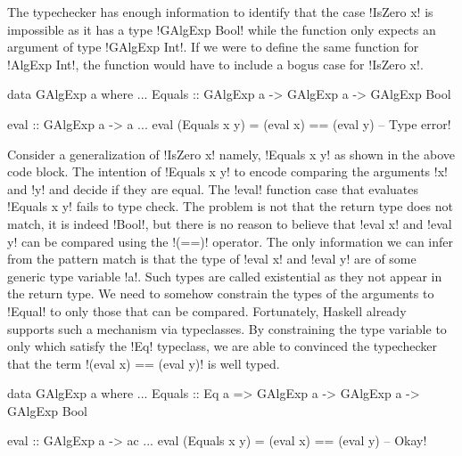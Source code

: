 \documentclass[screen,nonacm]{acmart}
\begin{document}
The typechecker has enough information to identify that the case
!IsZero x! is impossible as it has a type !GAlgExp Bool! while the
function only expects an argument of type !GAlgExp Int!. If we were to
define the same function for !AlgExp Int!, the function
would have to include a bogus case for !IsZero x!.

\begin{minipage}[ht]{0.6\linewidth}
\begin{CenteredBox}
\begin{code}
data GAlgExp a where
  ...
  Equals :: GAlgExp a -> GAlgExp a -> GAlgExp Bool
\end{code}
\end{CenteredBox}
\end{minipage}%
\begin{minipage}[ht]{0.4\linewidth}
\begin{CenteredBox}
\begin{code}
eval :: GAlgExp a -> a
...
eval (Equals x y) = (eval x) == (eval y)
                           -- Type error!
\end{code}
\end{CenteredBox}
\end{minipage}

Consider a generalization of !IsZero x! namely, !Equals x y! as shown
in the above code block. The intention of !Equals x y! to
encode comparing the arguments !x! and !y! and decide if they are
equal. The !eval! function case that evaluates !Equals x y! fails
to type check. The problem is not that the return type does not match,
it is indeed !Bool!, but there is no reason to believe that
!eval x! and !eval y! can be compared using the !(==)! operator. The
only information we can infer from the pattern match is that
the type of !eval x! and !eval y! are of some generic type variable
!a!. Such types are called existential as they not appear in
the return type. We need to somehow constrain the types of the
arguments to !Equal! to only those that can be compared.
Fortunately, Haskell already supports such a mechanism via
typeclasses. By constraining the type variable to only which satisfy
the !Eq! typeclass, we are able to convinced the typechecker that the
term !(eval x) == (eval y)! is well typed.


\begin{minipage}[ht]{0.5\linewidth}
\begin{CenteredBox}
\begin{code}
data GAlgExp a where
...
   Equals :: Eq a => GAlgExp a -> GAlgExp a
                  -> GAlgExp Bool
\end{code}
\end{CenteredBox}
\end{minipage}%
\begin{minipage}[ht]{0.4\linewidth}
\begin{CenteredBox}
\begin{code}
eval :: GAlgExp a -> ac
...
eval (Equals x y) = (eval x) == (eval y)
                              -- Okay!
\end{code}
\end{CenteredBox}
\end{minipage}
\end{document}
